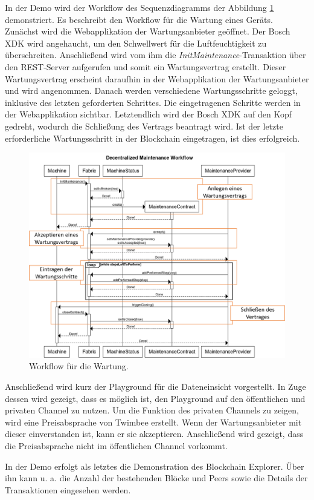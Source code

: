 In der Demo wird der Workflow des Sequenzdiagramms der Abbildung \ref{fig:maintenance-workflow} demonstriert. Es beschreibt den Workflow für die Wartung eines Geräts. Zunächst wird die Webapplikation der Wartungsanbieter geöffnet. Der Bosch XDK wird angehaucht, um den Schwellwert für die Luftfeuchtigkeit zu überschreiten. Anschließend wird vom ihm die \textit{InitMaintenance}-Transaktion über den REST-Server aufgerufen und somit ein Wartungsvertrag erstellt. Dieser Wartungsvertrag erscheint daraufhin in der Webapplikation der Wartungsanbieter und wird angenommen. Danach werden verschiedene Wartungsschritte geloggt, inklusive des letzten geforderten Schrittes. Die eingetragenen Schritte werden in der Webapplikation sichtbar. Letztendlich wird der Bosch XDK auf den Kopf gedreht, wodurch die Schließung des Vertrags beantragt wird. Ist der letzte erforderliche Wartungsschritt in der Blockchain eingetragen, ist dies erfolgreich.

\begin{figure}[!htbp]
    \centering
      \includegraphics[width=1.0\textwidth,angle=0]{images/maintenance-workflow-marked}
       \caption{Workflow für die Wartung.}
      \label{fig:maintenance-workflow}
\end{figure}

Anschließend wird kurz der Playground für die Dateneinsicht vorgestellt. In Zuge dessen wird gezeigt, dass es möglich ist, den Playground auf den öffentlichen und privaten Channel zu nutzen. Um die Funktion des privaten Channels zu zeigen, wird eine Preisabsprache von Twimbee erstellt. Wenn der Wartungsanbieter mit dieser einverstanden ist, kann er sie akzeptieren. Anschließend wird gezeigt, dass die Preisabsprache nicht im öffentlichen Channel vorkommt.

In der Demo erfolgt als letztes die Demonstration des Blockchain Explorer. Über ihn kann u. a. die Anzahl der bestehenden Blöcke und Peers sowie die Details der Transaktionen eingesehen werden.